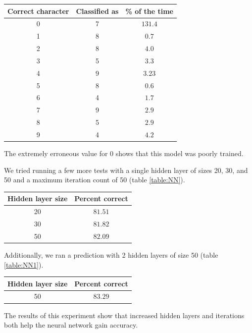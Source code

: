 \documentclass[11pt,a4paper]{article}
\begin{document}
\begin{center}
 \begin{tabular}{||c | c | c||} 
 \hline
 Correct character & Classified as & \% of the time \\ [0.5ex] 
 \hline\hline
 0 & 7 & $131.4$ \\ 
 \hline
 1 & 8 & $0.7$ \\
 \hline
 2 & 8 & $4.0$ \\
 \hline
 3 & 5 & $3.3$ \\
 \hline
 4 & 9 & $3.23$ \\
 \hline
 5 & 8 & $0.6$ \\
 \hline
 6 & 4 & $1.7$ \\
 \hline
 7 & 9 & $2.9$ \\
 \hline
 8 & 5 & $2.9$ \\
 \hline
 9 & 4 & $4.2$ \\ [1ex] 
 \hline
\end{tabular}
\end{center}

The extremely erroneous value for $0$ shows that this model was poorly trained.

We tried running a few more tests with a single hidden layer of sizes 20, 30, and 50 and a maximum iteration count of 50 (table \ref{table:NN}).

\begin{center}\label{table:NN}
 \begin{tabular}{||c | c||} 
 \hline
 Hidden layer size & Percent correct \\ [0.5ex] 
 \hline\hline
 20 & $81.51$ \\ 
 \hline
 30 & $81.82$ \\
 \hline
 50 & $82.09$ \\ [1ex] 
 \hline
\end{tabular}
\end{center}

Additionally, we ran a prediction with 2 hidden layers of size 50 (table \ref{table:NN1}).

\begin{center}\label{table:NN1}
 \begin{tabular}{||c | c||} 
 \hline
 Hidden layer size & Percent correct \\ [0.5ex] 
 \hline\hline
 50 & $83.29$ \\ [1ex] 
 \hline
\end{tabular}
\end{center}

The results of this experiment show that increased hidden layers and iterations both help the neural network gain accuracy.
\end{document}
